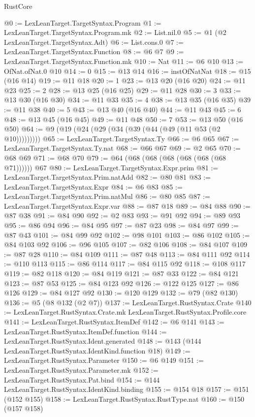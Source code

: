 \begin{lexlean}{RustCore}
\begin{coremodule}
@0 := LexLeanTarget.TargetSyntax.Program
@1 := LexLeanTarget.TargetSyntax.Program.mk
@2 := List.nil.{0}
@5 := @1 (@2 LexLeanTarget.TargetSyntax.Adt)
@6 := List.cons.{0}
@7 := LexLeanTarget.TargetSyntax.Function
@8 := @6 @7
@9 := LexLeanTarget.TargetSyntax.Function.mk
@10 := Nat
@11 := @6 @10
@13 := OfNat.ofNat.{0} @10
@14 := 0
@15 := @13 @14
@16 := instOfNatNat
@18 := @15 (@16 @14)
@19 := @11 @18
@20 := 1
@23 := @13 @20 (@16 @20)
@24 := @11 @23
@25 := 2
@28 := @13 @25 (@16 @25)
@29 := @11 @28
@30 := 3
@33 := @13 @30 (@16 @30)
@34 := @11 @33
@35 := 4
@38 := @13 @35 (@16 @35)
@39 := @11 @38
@40 := 5
@43 := @13 @40 (@16 @40)
@44 := @11 @43
@45 := 6
@48 := @13 @45 (@16 @45)
@49 := @11 @48
@50 := 7
@53 := @13 @50 (@16 @50)
@64 := @9 (@19 (@24 (@29 (@34 (@39 (@44 (@49 (@11 @53 (@2 @10)))))))))
@65 := LexLeanTarget.TargetSyntax.Ty
@66 := @6 @65
@67 := LexLeanTarget.TargetSyntax.Ty.nat
@68 := @66 @67
@69 := @2 @65
@70 := @68 @69
@71 := @68 @70
@79 := @64 (@68 (@68 (@68 (@68 (@68 (@68 @71)))))) @67
@80 := LexLeanTarget.TargetSyntax.Expr.prim
@81 := LexLeanTarget.TargetSyntax.Prim.natAdd
@82 := @80 @81
@83 := LexLeanTarget.TargetSyntax.Expr
@84 := @6 @83
@85 := LexLeanTarget.TargetSyntax.Prim.natMul
@86 := @80 @85
@87 := LexLeanTarget.TargetSyntax.Expr.var
@88 := @87 @18
@89 := @84 @88
@90 := @87 @38
@91 := @84 @90
@92 := @2 @83
@93 := @91 @92
@94 := @89 @93
@95 := @86 @94
@96 := @84 @95
@97 := @87 @23
@98 := @84 @97
@99 := @87 @43
@101 := @84 @99 @92
@102 := @98 @101
@103 := @86 @102
@105 := @84 @103 @92
@106 := @96 @105
@107 := @82 @106
@108 := @84 @107
@109 := @87 @28
@110 := @84 @109
@111 := @87 @48
@113 := @84 @111 @92
@114 := @110 @113
@115 := @86 @114
@117 := @84 @115 @92
@118 := @108 @117
@119 := @82 @118
@120 := @84 @119
@121 := @87 @33
@122 := @84 @121
@123 := @87 @53
@125 := @84 @123 @92
@126 := @122 @125
@127 := @86 @126
@129 := @84 @127 @92
@130 := @120 @129
@132 := @79 (@82 @130)
@136 := @5 (@8 @132 (@2 @7))
@137 := LexLeanTarget.RustSyntax.Crate
@140 := LexLeanTarget.RustSyntax.Crate.mk LexLeanTarget.RustSyntax.Profile.core
@141 := LexLeanTarget.RustSyntax.ItemDef
@142 := @6 @141
@143 := LexLeanTarget.RustSyntax.ItemDef.function
@144 := LexLeanTarget.RustSyntax.Ident.generated
@148 := @143 (@144 LexLeanTarget.RustSyntax.IdentKind.function @18)
@149 := LexLeanTarget.RustSyntax.Parameter
@150 := @6 @149
@151 := LexLeanTarget.RustSyntax.Parameter.mk
@152 := LexLeanTarget.RustSyntax.Pat.bind
@154 := @144 LexLeanTarget.RustSyntax.IdentKind.binding
@155 := @154 @18
@157 := @151 (@152 @155)
@158 := LexLeanTarget.RustSyntax.RustType.nat
@160 := @150 (@157 @158)

\end{coremodule}
\end{lexlean}
